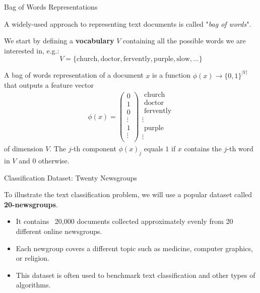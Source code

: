 \documentclass[../../generative_classifiers.tex]{subfiles}
\begin{document}
\begin{frame}[fragile]{Bag of Words Representations}



A widely-used approach to representing text documents is called "\textit{bag of words}".

We start by defining a \textbf{vocabulary} $V$ containing all the possible words we are interested in, e.g.:
$$ V = \{\text{church}, \text{doctor}, \text{fervently}, \text{purple}, \text{slow}, ...\} $$

A bag of words representation of a document $x$ is a function $\phi(x) \to \{0,1\}^{|V|}$ that outputs a feature vector
$$
\phi(x) = \left( 
\begin{array}{c}
0 \\
1 \\
0 \\
\vdots \\
1 \\
\vdots \\
\end{array}
\right)
\begin{array}{l}
\;\text{church} \\
\;\text{doctor} \\
\;\text{fervently} \\
\vdots \\
\;\text{purple} \\
\vdots \\
\end{array}
$$
of dimension $V$. The $j$-th component $\phi(x)_j$ equals $1$ if $x$ contains the $j$-th word in $V$ and $0$ otherwise.


\end{frame}

\begin{frame}[fragile]{Classification Dataset: Twenty Newsgroups}

To illustrate the text classification problem, we will use a popular dataset called \textbf{20-newsgroups}. 
\begin{itemize}
    \item It contains ~20,000 documents collected approximately evenly from 20 different online newsgroups.
    \item Each newgroup covers a different topic such as medicine, computer graphics, or religion.
    \item This dataset is often used to benchmark text classification and other types of algorithms.
\end{itemize}


\end{frame}
\end{document}
